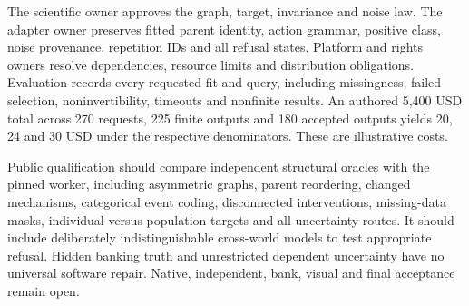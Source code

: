 The scientific owner approves the graph, target, invariance and noise law.
The adapter owner preserves fitted parent identity, action grammar,
positive class, noise provenance, repetition IDs and all refusal states.
Platform and rights owners resolve dependencies, resource limits and
distribution obligations. Evaluation records every requested fit and query,
including missingness, failed selection, noninvertibility, timeouts and
nonfinite results. An authored 5,400 USD total across 270 requests,
225 finite outputs and 180 accepted outputs yields 20, 24 and 30 USD
under the respective denominators. These are illustrative costs.
\citep{exec24_gcm_choice}

Public qualification should compare independent structural oracles with
the pinned worker, including asymmetric graphs, parent reordering,
changed mechanisms, categorical event coding, disconnected interventions,
missing-data masks, individual-versus-population targets and all uncertainty
routes. It should include deliberately indistinguishable cross-world models
to test appropriate refusal. Hidden banking truth and unrestricted dependent
uncertainty have no universal software repair. Native, independent, bank,
visual and final acceptance remain open.\citep{exec24_gcm_choice}
